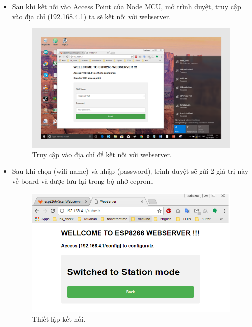\documentclass[a4paper,12pt,oneside]{article}
\begin{document}
\begin{enumerate}
\begin{itemize}
\begin{itemize}
			\item Sau khi kết nối vào Access Point của Node MCU, mở trình duyệt, truy cập vào địa chỉ (192.168.4.1) ta sẽ kết nối với webserver.
			\begin{figure}[H]
			\centering
			\includegraphics[scale=.85]{hinh/webserver_2.PNG}
			\caption{Truy cập vào địa chỉ để kết nối với webserver.}
			\end{figure}
			
			\item Sau khi chọn (wifi name) và nhập (password), trình duyệt sẽ gửi 2 giá trị này về board và được lưu lại trong bộ nhớ eeprom.
			\begin{figure}[H]
			\centering
			\includegraphics[scale=.8]{hinh/webserver_3.PNG}
			\caption{Thiết lập kết nối.}
			\end{figure}
			

\end{itemize}
\end{itemize}
\end{enumerate}
\end{document}
